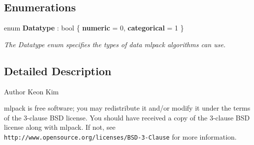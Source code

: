 \subsection*{Enumerations}
\begin{DoxyCompactItemize}
\item 
enum \textbf{ Datatype} \+: bool \{ \newline
\textbf{ numeric} = 0, 
\newline
\textbf{ categorical} = 1
 \}\begin{DoxyCompactList}\small\item\em The Datatype enum specifies the types of data mlpack algorithms can use. \end{DoxyCompactList}
\end{DoxyCompactItemize}


\subsection{Detailed Description}
\begin{DoxyAuthor}{Author}
Keon Kim
\end{DoxyAuthor}
mlpack is free software; you may redistribute it and/or modify it under the terms of the 3-\/clause B\+SD license. You should have received a copy of the 3-\/clause B\+SD license along with mlpack. If not, see {\tt http\+://www.\+opensource.\+org/licenses/\+B\+S\+D-\/3-\/\+Clause} for more information. 
